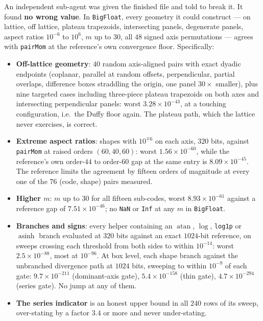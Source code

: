 \documentclass[11pt]{article}
\theoremstyle{remark}
\newcommand{\asinh}{\operatorname{asinh}}
\newcommand{\atan}{\operatorname{atan}}
\newcommand{\code}[1]{\texttt{#1}}
\begin{document}
An independent sub-agent was given the finished file and told to break it. It found
\textbf{no wrong value}. In \code{BigFloat}, every geometry it could construct --- on
lattice, off lattice, plateau trapezoids, intersecting panels, degenerate panels, aspect
ratios $10^{-6}$ to $10^{6}$, $m$ up to $30$, all $48$ signed axis permutations --- agrees
with \code{pairMom} at the reference's own convergence floor. Specifically:

\begin{itemize}[nosep]
\item \textbf{Off-lattice geometry}: $40$ random axis-aligned pairs with exact dyadic
endpoints (coplanar, parallel at random offsets, perpendicular, partial overlaps,
difference boxes straddling the origin, one panel $30\times$ smaller), plus nine targeted
cases including three-piece plateau trapezoids on both axes and intersecting perpendicular
panels: worst $3.28\times10^{-43}$, at a touching configuration, i.e.\ the Duffy floor
again. The plateau path, which the lattice never exercises, is correct.
\item \textbf{Extreme aspect ratios}: shapes with $10^{\mp6}$ on each axis, $320$ bits,
against \code{pairMom} at raised orders $(60,40,60)$: worst $1.56\times10^{-60}$, while
the reference's own order-$44$ to order-$60$ gap at the same entry is
$8.09\times10^{-45}$. The reference limits the agreement by fifteen orders of magnitude at
every one of the $76$ (code, shape) pairs measured.
\item \textbf{Higher $m$}: $m$ up to $30$ for all fifteen sub-codes, worst
$8.93\times10^{-61}$ against a reference gap of $7.51\times10^{-46}$; no \code{NaN} or
\code{Inf} at any $m$ in \code{BigFloat}.
\item \textbf{Branches and signs}: every helper containing an $\atan$, $\log$,
\code{log1p} or $\asinh$ branch evaluated at $320$ bits against an exact $1024$-bit
reference, on sweeps crossing each threshold from both sides to within $10^{-14}$: worst
$2.5\times10^{-88}$, most at $10^{-96}$. At box level, each shape branch against the
unbranched divergence path at $1024$ bits, sweeping to within $10^{-9}$ of each gate:
$9.7\times10^{-211}$ (dominant-axis gate), $5.4\times10^{-158}$ (thin gate),
$4.7\times10^{-294}$ (series gate). No jump at any of them.
\item \textbf{The series indicator} is an honest upper bound in all $240$ rows of its
sweep, over-stating by a factor $3.4$ or more and never under-stating.
\end{itemize}
\end{document}
